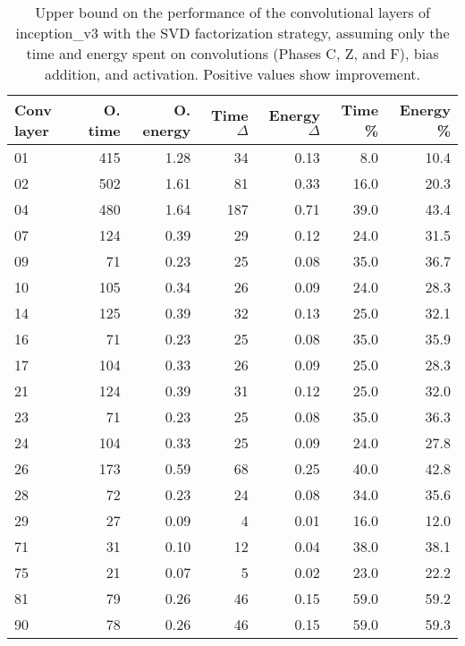 \begin{table}
\centering
\begin{tabular}{|l|r|r|r|r|r|r|}
\hline
Conv layer & O. time & O. energy & Time $\Delta$ & Energy $\Delta$ & Time \% & Energy \% \\\hline
01 & 415 & 1.28 & 34 & 0.13 & 8.0 & 10.4 \\\hline
02 & 502 & 1.61 & 81 & 0.33 & 16.0 & 20.3 \\\hline
04 & 480 & 1.64 & 187 & 0.71 & 39.0 & 43.4 \\\hline
07 & 124 & 0.39 & 29 & 0.12 & 24.0 & 31.5 \\\hline
09 & 71 & 0.23 & 25 & 0.08 & 35.0 & 36.7 \\\hline
10 & 105 & 0.34 & 26 & 0.09 & 24.0 & 28.3 \\\hline
14 & 125 & 0.39 & 32 & 0.13 & 25.0 & 32.1 \\\hline
16 & 71 & 0.23 & 25 & 0.08 & 35.0 & 35.9 \\\hline
17 & 104 & 0.33 & 26 & 0.09 & 25.0 & 28.3 \\\hline
21 & 124 & 0.39 & 31 & 0.12 & 25.0 & 32.0 \\\hline
23 & 71 & 0.23 & 25 & 0.08 & 35.0 & 36.3 \\\hline
24 & 104 & 0.33 & 25 & 0.09 & 24.0 & 27.8 \\\hline
26 & 173 & 0.59 & 68 & 0.25 & 40.0 & 42.8 \\\hline
28 & 72 & 0.23 & 24 & 0.08 & 34.0 & 35.6 \\\hline
29 & 27 & 0.09 & 4 & 0.01 & 16.0 & 12.0 \\\hline
71 & 31 & 0.10 & 12 & 0.04 & 38.0 & 38.1 \\\hline
75 & 21 & 0.07 & 5 & 0.02 & 23.0 & 22.2 \\\hline
81 & 79 & 0.26 & 46 & 0.15 & 59.0 & 59.2 \\\hline
90 & 78 & 0.26 & 46 & 0.15 & 59.0 & 59.3 \\\hline
\end{tabular}
\caption{Upper bound on the performance of the convolutional layers of inception\_v3 with the SVD factorization strategy, assuming only the time and energy spent on convolutions (Phases C, Z, and F), bias addition, and activation. Positive values show improvement.}
\label{inception_v3-max-performance}
\end{table}
